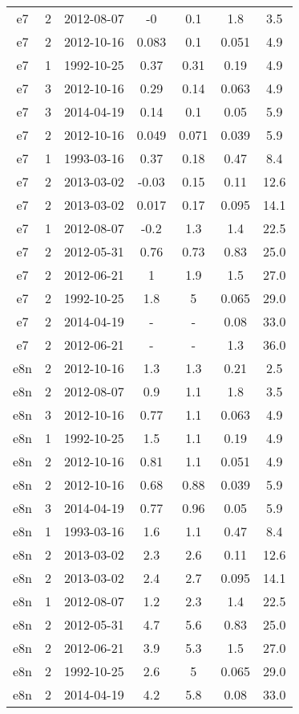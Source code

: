 \begin{table*}[htp]
\begin{tabular}{ccccccc}
e7 & 2 & 2012-08-07 & -0 & 0.1 & 1.8 & 3.5 \\
e7 & 2 & 2012-10-16 & 0.083 & 0.1 & 0.051 & 4.9 \\
e7 & 1 & 1992-10-25 & 0.37 & 0.31 & 0.19 & 4.9 \\
e7 & 3 & 2012-10-16 & 0.29 & 0.14 & 0.063 & 4.9 \\
e7 & 3 & 2014-04-19 & 0.14 & 0.1 & 0.05 & 5.9 \\
e7 & 2 & 2012-10-16 & 0.049 & 0.071 & 0.039 & 5.9 \\
e7 & 1 & 1993-03-16 & 0.37 & 0.18 & 0.47 & 8.4 \\
e7 & 2 & 2013-03-02 & -0.03 & 0.15 & 0.11 & 12.6 \\
e7 & 2 & 2013-03-02 & 0.017 & 0.17 & 0.095 & 14.1 \\
e7 & 1 & 2012-08-07 & -0.2 & 1.3 & 1.4 & 22.5 \\
e7 & 2 & 2012-05-31 & 0.76 & 0.73 & 0.83 & 25.0 \\
e7 & 2 & 2012-06-21 & 1 & 1.9 & 1.5 & 27.0 \\
e7 & 2 & 1992-10-25 & 1.8 & 5 & 0.065 & 29.0 \\
e7 & 2 & 2014-04-19 & - & - & 0.08 & 33.0 \\
e7 & 2 & 2012-06-21 & - & - & 1.3 & 36.0 \\
e8n & 2 & 2012-10-16 & 1.3 & 1.3 & 0.21 & 2.5 \\
e8n & 2 & 2012-08-07 & 0.9 & 1.1 & 1.8 & 3.5 \\
e8n & 3 & 2012-10-16 & 0.77 & 1.1 & 0.063 & 4.9 \\
e8n & 1 & 1992-10-25 & 1.5 & 1.1 & 0.19 & 4.9 \\
e8n & 2 & 2012-10-16 & 0.81 & 1.1 & 0.051 & 4.9 \\
e8n & 2 & 2012-10-16 & 0.68 & 0.88 & 0.039 & 5.9 \\
e8n & 3 & 2014-04-19 & 0.77 & 0.96 & 0.05 & 5.9 \\
e8n & 1 & 1993-03-16 & 1.6 & 1.1 & 0.47 & 8.4 \\
e8n & 2 & 2013-03-02 & 2.3 & 2.6 & 0.11 & 12.6 \\
e8n & 2 & 2013-03-02 & 2.4 & 2.7 & 0.095 & 14.1 \\
e8n & 1 & 2012-08-07 & 1.2 & 2.3 & 1.4 & 22.5 \\
e8n & 2 & 2012-05-31 & 4.7 & 5.6 & 0.83 & 25.0 \\
e8n & 2 & 2012-06-21 & 3.9 & 5.3 & 1.5 & 27.0 \\
e8n & 2 & 1992-10-25 & 2.6 & 5 & 0.065 & 29.0 \\
e8n & 2 & 2014-04-19 & 4.2 & 5.8 & 0.08 & 33.0 \\

\end{tabular}
\end{table*}

